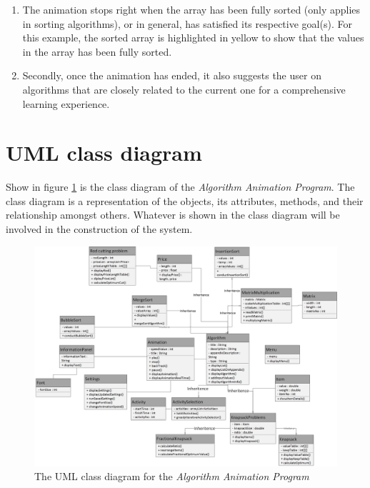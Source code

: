 \begin{enumerate}
\item The animation stops right when the array has been fully sorted (only applies in sorting algorithms), or in general, has satisfied its respective goal(s). For this example, the sorted array is highlighted in yellow to show that the values in the array has been fully sorted.
\item Secondly, once the animation has ended, it also suggests the user on algorithms that are closely related to the current one for a comprehensive learning experience.
\end{enumerate}

\newpage


\section{UML class diagram}

Show in figure \ref{UMLClassDiagram} is the class diagram of the \textit{Algorithm Animation Program}. The class diagram is a representation of the objects, its attributes, methods, and their relationship amongst others. Whatever is shown in the class diagram will be involved in the construction of the system. 

\begin{landscape}
\begin{figure}[H]
\centering
\includegraphics[scale=.37]{images/report_images/UMLClassDiagram.png}
\caption{The UML class diagram for the \textit{Algorithm Animation Program}}
\label{UMLClassDiagram}
\end{figure}
\end{landscape}

